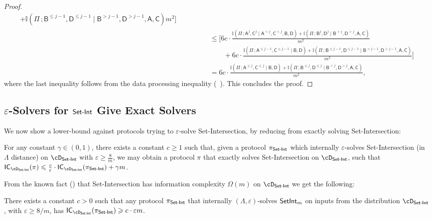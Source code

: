 \documentclass[11pt,letterpaper]{article}
\newcommand{\eps}{\varepsilon}
\renewcommand{\geq}{\geqslant}
\renewcommand{\leq}{\leqslant}
\renewcommand{\le}{\leq}
\renewcommand{\ge}{\geq}
\theoremstyle{definition}
\newcommand{\dsi}{\cD_\SI}
\newcommand{\pisi}{\pi_\SI}
\newcommand{\ptd}{\Lambda}
\newcommand{\rPi}{\rv{\Pi}}
\newcommand{\setint}{\ensuremath{\textnormal{\textsf{SetInt}}}\xspace}
\newcommand{\rA}{\rv{A}}
\newcommand{\rB}{\rv{B}}
\newcommand{\rC}{\rv{C}}
\newcommand{\rD}{\rv{D}}
\newcommand{\rv}[1]{\ensuremath{\mathsf{#1}}}
\newcommand{\II}{\ensuremath{\mathbb{I}}}
\newcommand{\mi}[2]{\ensuremath{\II(#1 \,; #2)}}
\newcommand{\SI}{\ensuremath{\textnormal{\textsf{Set-Int}}}\xspace}
\newcommand{\ICost}[2]{\ensuremath{\textnormal{\textsf{IC}}_{#2}(#1)}\xspace}
\begin{document}
\begin{proof}
\begin{align*}
{            + \mi{\rPi}{\rB^{\le j-1},\rD^{\le j-1} \mid \rB^{> j-1}, \rD^{> j-1}, \rA,\rC}}{m^2}\bigg]\\
          &         \qquad \qquad
          \leq
          \bigg[6 c \cdot \frac{\mi{\rPi}{\rA^j,\rC^j\mid \rA^{< j},\rC^{< j}, \rB,\rD} + \mi{\rPi}{\rB^j,\rD^j \mid \rB^{> j},\rD^{>j}, \rA,\rC}}{m^2} \\
          &\qquad \qquad\qquad 
            + 6 c \cdot \frac{\mi{\rPi}{\rA^{\le j-1},\rC^{\le j-1} \mid \rB,\rD}
            + \mi{\rPi}{\rB^{\le j-1},\rD^{\le j-1} \mid \rB^{> j-1}, \rD^{> j-1}, \rA,\rC}}{m^2}\bigg]\\
          & \qquad\qquad =
            6 c \cdot \frac{\mi{\rPi}{\rA^{\le j},\rC^{\le j} \mid \rB,\rD}
           + \mi{\rPi}{\rB^{\le j},\rD^{\le j} \mid \rB^{> j}, \rD^{> j},
         \rA,\rC}}{m^2},
	\end{align*}
where the last inequality follows from the data processing inequality
(~).
This concludes the proof.
\end{proof}




\subsection{\texorpdfstring{$\eps$-Solvers for $\SI$ Give Exact Solvers}{eps-Solvers for Set Intersection Give Exact Solvers}}\label{sec:exact-to-eps}



We now show a lower-bound against protocols trying to $\eps$-solve
Set-Intersection, by reducing from exactly solving Set-Intersection:


\begin{theorem}\label{thm:si-ic-lb} For any constant $\gamma \in (0,1)$, there exists a constant $c \ge 1$ such that, given a protocol $\pisi$ which internally 
$\eps$-solves Set-Intersection (in $\ptd$ distance) on $\dsi$ with
$\eps \ge \frac{8}{m}$,
we may obtain a protocol $\pi$ that exactly solves Set-Intersection on $\dsi$,
such that
$\ICost{\pi}{\dsi} \leq {\frac{c}{\eps} \cdot \ICost{\pisi}{\dsi} + \gamma m}$.
\end{theorem}

From the known fact () that Set-Intersection has information
complexity $\Omega(m)$ on $\dsi$ we get the following:

\begin{corollary}\label{cor:si-ic-lb-external}
  There exists a constant $c > 0$ such that
  any protocol $\pisi$ that internally $(\ptd, \eps)$-solves $\setint_m$ on
  inputs from the distribution $\dsi$, with $\eps \geq 8 / m$, has $\ICost{\pisi}{\dsi} \geq c \cdot \eps m$.
\end{corollary}
\end{document}

